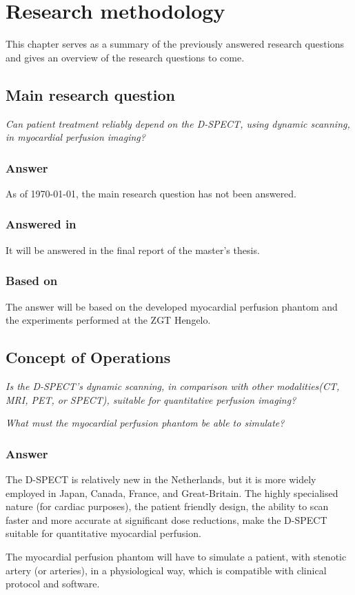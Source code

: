 \chapter{Research methodology}
This chapter serves as a summary of the previously answered research questions and gives an overview of the research questions to come.
\section{Main research question}
\textit{Can patient treatment reliably depend on the D-SPECT, using dynamic scanning, in myocardial perfusion imaging?}
\subsection*{Answer}
As of \today, the main research question has not been answered.
\subsection*{Answered in}
It will be answered in the final report of the master's thesis.
\subsection*{Based on}
The answer will be based on the developed myocardial perfusion phantom and the experiments performed at the ZGT Hengelo.
\section{Concept of Operations}
\label{sec:concept_oper}
\textit{Is the D-SPECT's dynamic scanning, in comparison with other modalities(CT, MRI, PET, or SPECT), suitable for quantitative perfusion imaging?}

\textit{What must the myocardial perfusion phantom be able to simulate?}
\subsection*{Answer}
The D-SPECT is relatively new in the Netherlands, but it is more widely employed in Japan, Canada, France, and Great-Britain. The highly specialised nature (for cardiac purposes), the patient friendly design, the ability to scan faster and more accurate at significant dose reductions, make the D-SPECT suitable for quantitative myocardial perfusion.

The myocardial perfusion phantom will have to simulate a patient, with stenotic artery (or arteries), in a physiological way, which is compatible with clinical protocol and software.
